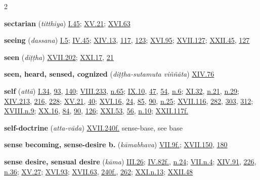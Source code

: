 \begin{multicols}{2}
\begin{vismHanging}
\par\textbf{sectarian} (\emph{titthiya}) \hyperlink{I.45}{I.45}{}; \hyperlink{XV.21}{XV.21}{}; \hyperlink{XVI.63}{XVI.63}{}
\par\textbf{seeing} (\emph{dassana}) \hyperlink{I.5}{I.5}{}; \hyperlink{IV.45}{IV.45}{}; \hyperlink{XIV.13}{XIV.13}{}, \hyperlink{XIV.117}{117}{}, \hyperlink{XIV.123}{123}{}; \hyperlink{XVI.95}{XVI.95}{}; \hyperlink{XVII.127}{XVII.127}{}; \hyperlink{XXII.45}{XXII.45}{}, \hyperlink{XXII.127}{127}{}
\par\textbf{seen} (\emph{diṭṭha}) \hyperlink{XVII.202}{XVII.202}{}; \hyperlink{XXI.17}{XXI.17}{}, \hyperlink{XXI.21}{21}{}
\par\textbf{seen, heard, sensed, cognized} (\emph{diṭṭha-sutamuta viññāta}) \hyperlink{XIV.76}{XIV.76}{}
\par\textbf{self} (\emph{attā}) \hyperlink{I.34}{I.34}{}, \hyperlink{I.93}{93}{}, \hyperlink{I.140}{140}{}; \hyperlink{VIII.233}{VIII.233}{}, \hyperlink{VIII.n65}{n.65}{}; \hyperlink{IX.10}{IX.10}{}, \hyperlink{IX.47}{47}{}, \hyperlink{IX.54}{54}{}, \hyperlink{IX.n6}{n.6}{}; \hyperlink{XI.32}{XI.32}{}, \hyperlink{XI.n21}{n.21}{}, \hyperlink{XI.n29}{n.29}{}; \hyperlink{XIV.213}{XIV.213}{}, \hyperlink{XIV.216}{216}{}, \hyperlink{XIV.228}{228}{}; \hyperlink{XV.21}{XV.21}{}, \hyperlink{XV.40}{40}{}; \hyperlink{XVI.16}{XVI.16}{}, \hyperlink{XVI.24}{24}{}, \hyperlink{XVI.85}{85}{}, \hyperlink{XVI.90}{90}{}, \hyperlink{XVI.n25}{n.25}{}; \hyperlink{XVII.116}{XVII.116}{}, \hyperlink{XVII.282}{282}{}, \hyperlink{XVII.303}{303}{}, \hyperlink{XVII.312}{312}{}; \hyperlink{XVIII.n9}{XVIII.n.9}{}; \hyperlink{XX.16}{XX.16}{}, \hyperlink{XX.84}{84}{}, \hyperlink{XX.90}{90}{}, \hyperlink{XX.126}{126}{}; \hyperlink{XXI.53}{XXI.53}{}, \hyperlink{XXI.56}{56}{}, \hyperlink{XXI.n10}{n.10}{}; \hyperlink{XXII.117}{XXII.117f.}{}
\par\textbf{self-doctrine} (\emph{atta-vāda}) \hyperlink{XVII.240}{XVII.240f.}{} sense-base, see base
\par\textbf{sense becoming, sense-desire b.} (\emph{kāmabhava}) \hyperlink{VII.9}{VII.9f.}{}; \hyperlink{XVII.150}{XVII.150}{}, \hyperlink{XVII.180}{180}{}
\par\textbf{sense desire, sensual desire} (\emph{kāma}) \hyperlink{III.26}{III.26}{}; \hyperlink{IV.82}{IV.82f.}{}, \hyperlink{IV.n24}{n.24}{}; \hyperlink{VII.n4}{VII.n.4}{}; \hyperlink{XIV.91}{XIV.91}{}, \hyperlink{XIV.226}{226}{}, \hyperlink{XIV.n36}{n.36}{}; \hyperlink{XV.27}{XV.27}{}; \hyperlink{XVI.93}{XVI.93}{}; \hyperlink{XVII.63}{XVII.63}{}, \hyperlink{XVII.240}{240f.}{}, \hyperlink{XVII.262}{262}{}; \hyperlink{XXI.n13}{XXI.n.13}{}; \hyperlink{XXII.48}{XXII.48}{}

\end{vismHanging}
\end{multicols}

